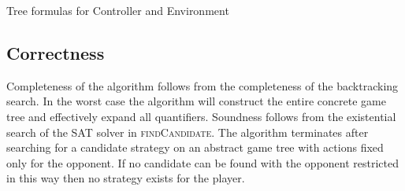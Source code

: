 \begin{algorithm}
    \caption{Tree formulas for Controller and Environment}
    \label{alg:treeFormula}
    \begin{algorithmic}[1]
        \State {}
        \Else
        \State {}
        \EndIf
        \EndFunction
    \end{algorithmic}

    \begin{algorithmic}[1]
        \State {}
        \Else
        \State {}
        \EndIf
        \EndFunction
    \end{algorithmic}
\end{algorithm}

\subsection{Correctness}

Completeness of the algorithm follows from the completeness of the backtracking search. In the worst case the algorithm will construct the entire concrete game tree and effectively expand all quantifiers. Soundness follows from the existential search of the SAT solver in \textsc{findCandidate}. The algorithm terminates after searching for a candidate strategy on an abstract game tree with actions fixed only for the opponent. If no candidate can be found with the opponent restricted in this way then no strategy exists for the player.

